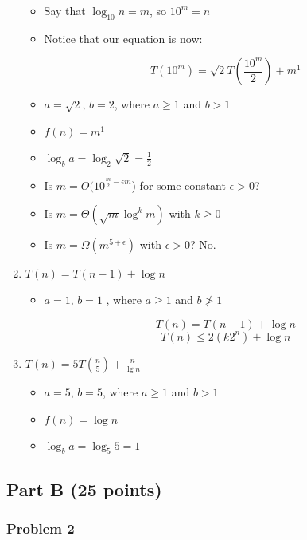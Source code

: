 \documentclass[11pt]{article}
\begin{document}
\begin{enumerate}[label=\Alph*.]
\begin{itemize}
		\item Say that $\log_{10} n = m$, so $10^m = n$
		\item Notice that our equation is now:
		
			$$T(10^m) = \sqrt{2} T\left(\frac{10^m}{2}\right) + m^1$$
		
		\item $a = \sqrt{2}$, $b = 2$, where $a \geq 1$ and $b > 1$
		\item $f(n) = m^1$
		\item $\log_b a = \log_2 \sqrt{2} = \frac{1}{2}$
		\item Is $m = O(10^{\frac{m}{2} - \epsilon m}$) for some constant $\epsilon > 0$?
		\item Is $m = \Theta(\sqrt{m} \log^k m)$ with $k \geq 0$
		\item Is $m = \Omega(m^{5+\epsilon})$ with $\epsilon > 0$? No.
	
	\end{itemize}
	
	\item $T(n) = T(n-1) + \log n$
	
	\begin{itemize}
	
		\item $a = 1$, $b = 1$ , where $a \geq 1$ and $b \not> 1$
		
		$$ T(n) = T(n-1) + \log n $$
		$$ T(n) \le 2(k2^{n}) + \log n  $$
	
	\end{itemize}
	
	\item $T(n) = 5T(\frac{n}{5}) + \frac{n}{\lg n}$
	
	\begin{itemize}
	
		\item $a = 5$, $b = 5$, where $a \geq 1$ and $b > 1$
		\item $f(n) = \log n$
		\item $\log_b a = \log_5 5 = 1$
	
	\end{itemize}
	
\end{enumerate}

\subsection*{Part B (25 points)}

\subsubsection*{Problem 2} 
\end{document}
